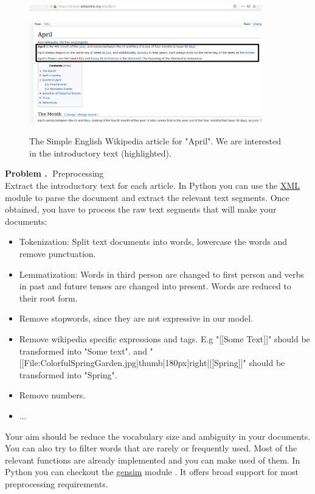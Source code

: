 \documentclass[10pt]{article}
\newcounter{problemCounter}
\newenvironment{problem}[1]
{
	\vspace{0.5cm}
	\refstepcounter{problemCounter}\label{#1}
	\noindent \textbf{Problem \theproblemCounter.$\;$} 
}{}
\begin{document}
\begin{figure}
	\includegraphics[width=0.9\textwidth]{article_intro.png}
	\label{fig:article_intro}
	\caption{The Simple English Wikipedia article for "April". We are interested in the introductory text (highlighted).}
\end{figure}

\begin{problem}
	PPreprocessing \\
	Extract the introductory text for each article. In Python you can use the \href{https://docs.python.org/3.7/library/xml.etree.elementtree.html}{XML} module \cite{url:python-xml} to parse the document and extract the relevant text segments. Once obtained, you have to process the raw text segments that will make your documents:
	\begin{itemize}
		\item Tokenization: Split text documents into words, lowercase the words and remove punctuation.
		\item Lemmatization: Words in third person are changed to first person and verbs in past and future tenses are changed into present. Words are reduced to their root form.
		\item Remove stopwords, since they are not expressive in our model.
		\item Remove wikipedia specific expressions and tags. E.g "[[Some Text]]" should be transformed into "Some text". and "[[File:ColorfulSpringGarden.jpg|thumb|180px|right|[[Spring]]" should be transformed into "Spring".
		\item Remove numbers.
		\item ...
	\end{itemize}
	Your aim should be reduce the vocabulary size and ambiguity in your documents.
	You can also try to filter words that are rarely or frequently used. Most of the relevant functions are already implemented and you can make used of them. In Python you can checkout the 
	\href{https://radimrehurek.com/gensim/parsing/preprocessing.html}{gensim} module \cite{url:python-gensim}. It offers broad support for most preprocessing requirements.
\end{problem}
\end{document}
